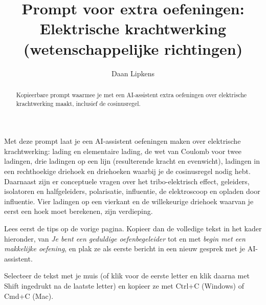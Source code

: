 \documentclass{ximera}
\title{Prompt voor extra oefeningen: Elektrische krachtwerking (wetenschappelijke richtingen)}
\author{Daan Lipkens}
\begin{document}
\begin{abstract}
    Kopieerbare prompt waarmee je met een AI-assistent extra oefeningen over elektrische krachtwerking maakt, inclusief de cosinusregel.
\end{abstract}
\maketitle

Met deze prompt laat je een AI-assistent oefeningen maken over elektrische krachtwerking: lading en elementaire lading, de wet van Coulomb voor twee ladingen, drie ladingen op een lijn (resulterende kracht en evenwicht), ladingen in een rechthoekige driehoek en driehoeken waarbij je de cosinusregel nodig hebt. Daarnaast zijn er conceptuele vragen over het tribo-elektrisch effect, geleiders, isolatoren en halfgeleiders, polarisatie, influentie, de elektroscoop en opladen door influentie. Vier ladingen op een vierkant en de willekeurige driehoek waarvan je eerst een hoek moet berekenen, zijn verdieping.

Lees eerst de tips op de vorige pagina. Kopieer dan de volledige tekst in het kader hieronder, van \textit{Je bent een geduldige oefenbegeleider} tot en met \textit{begin met een makkelijke oefening}, en plak ze als eerste bericht in een nieuw gesprek met je AI-assistent.

\begin{onlineOnly}
    Selecteer de tekst met je muis (of klik voor de eerste letter en klik daarna met Shift ingedrukt na de laatste letter) en kopieer ze met Ctrl+C (Windows) of Cmd+C (Mac).
\end{onlineOnly}
\end{document}
